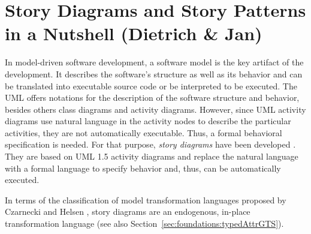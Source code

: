 \section{Story Diagrams and Story Patterns in a Nutshell (Dietrich \& Jan)} \label{sec:Overview}



In model-driven software development, a software model is the key artifact of the development.
It describes the software's structure as well as its behavior and 
can be translated into executable source code or be interpreted to be executed.
The UML offers notations for the description of the software structure and behavior,
besides others class diagrams and activity diagrams.
However, since UML activity diagrams use natural language in the activity nodes to describe the particular activities, they are not automatically executable.
Thus, a formal behavioral specification is needed.
For that purpose, \emph{story diagrams} have been developed \cite{FNTZ00,Zun01}.
They are based on UML 1.5 activity diagrams \cite{UML1.5} and replace the natural language with a formal language to specify behavior
and, thus, can be automatically executed.

In terms of the classification of model transformation languages proposed by Czarnecki and Helsen \cite{Czarnecki06},
story diagrams are an endogenous, in-place transformation language (see also Section~\ref{sec:foundations:typedAttrGTS}).


